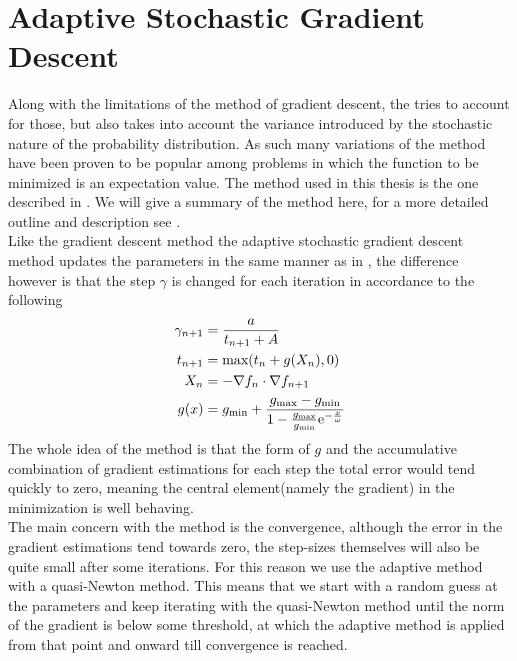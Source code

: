 \section{Adaptive Stochastic Gradient
Descent\label{sec:adaptive_stochastic_gradient_descent}}
    Along with the limitations of the method of gradient descent, the
     tries to account for those,
    but also takes into account the variance introduced by the stochastic
    nature of the probability distribution. As such many variations of the
    method have been proven to be popular among problems in which the function
    to be minimized is an expectation value. The method used in this thesis is
    the one described in \cite{ASGD}. We will give a summary of the method
    here, for a more detailed outline and description see \cite{ASGD}. \\

    Like the gradient descent method the adaptive stochastic gradient descent
    method updates the parameters in the same manner as in ,
    the difference however is that the step $\gamma$ is changed for each
    iteration in accordance to the following
        \begin{equation}
            \begin{aligned}
                \gamma_{n+1} &= \frac{a}{t_{n+1} + A} \\
                t_{n+1} &= \text{max}(t_n + g(X_n), 0) \\
                X_n &= - \nabla f_n \cdot \nabla f_{n+1} \\
                g(x) &= g_{\text{min}} + \frac{g_{\text{max}} -
                g_{\text{min}}}{1 - \frac{g_{\text{max}}}{g_{\text{min}}}
                \mathrm{e}^{-\frac{x}{\omega}}}
            \end{aligned}
        \end{equation}
    The whole idea of the method is that the form of $g$ and the accumulative
    combination of gradient estimations for each step the total error would
    tend quickly to zero, meaning the central element(namely the gradient) in
    the minimization is well behaving. \\

    The main concern with the method is the convergence, although the error in
    the gradient estimations tend towards zero, the step-sizes themselves will
    also be quite small after some iterations. For this reason we use the
    adaptive method with a quasi-Newton method. This means that we start with a
    random guess at the parameters and keep iterating with the quasi-Newton
    method until the norm of the gradient is below some threshold, at which the
    adaptive method is applied from that point and onward till convergence is
    reached.

